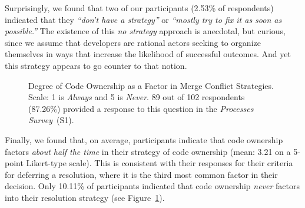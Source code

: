 Surprisingly, we found that two of our participants (2.53\% of respondents) indicated that they \textit{``don't have a strategy''} or \textit{``mostly try to fix it as soon as possible.''}
The existence of this \textit{no strategy} approach is anecdotal, but curious, since we assume that developers are rational actors seeking to organize themselves in ways that increase the likelihood of successful outcomes.
And yet this strategy appears to go counter to that notion.

\begin{figure}[!htbp]
\centering
{}
\caption{Degree of Code Ownership as a Factor in Merge Conflict Strategies. Scale: 1 is \textit{Always} and 5 is \textit{Never}. 89 out of 102 respondents (87.26\%) provided a response to this question in the \textit{Processes Survey}~(S1).}
\label{fig:code-ownership-resolution}
\end{figure}


Finally, we found that, on average, participants indicate that code ownership factors \textit{about half the time} in their strategy of code ownership (mean: 3.21 on a 5-point Likert-type scale).
This is consistent with their responses for their criteria for deferring a resolution, where it is the third most common factor in their decision. 
Only 10.11\% of participants indicated that code ownership \textit{never} factors into their resolution strategy (see Figure~\ref{fig:code-ownership-resolution}).

